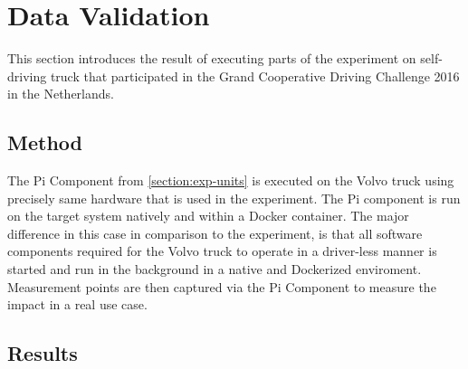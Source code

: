 \iffalse  \fi
\chapter{Data Validation}\label{section:data-validation}

This section introduces the result of executing parts of the experiment on self-driving truck that participated in the Grand Cooperative Driving Challenge 2016 in the Netherlands. 

\section{Method}
The Pi Component from \ref{section:exp-units} is executed on the Volvo truck using precisely same hardware that is used in the experiment. The Pi component is run on the target system natively and within a Docker container. The major difference in this case in comparison to the experiment, is that all software components required for the Volvo truck to operate in a driver-less manner is started and run in the background in a native and Dockerized enviroment. Measurement points are then captured via the Pi Component to measure the impact in a real use case. 

\section{Results}